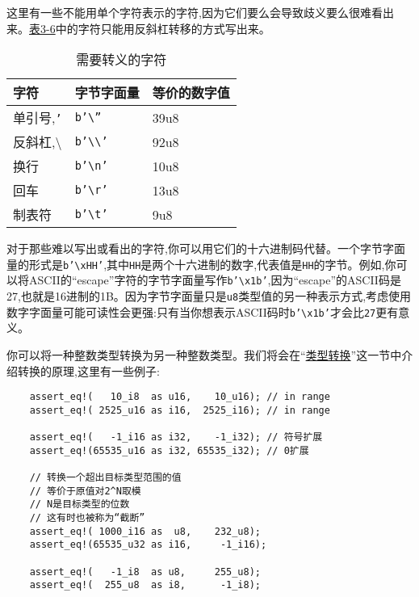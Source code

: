这里有一些不能用单个字符表示的字符,因为它们要么会导致歧义要么很难看出来。\hyperref[t3-6]{表3-6}中的字符只能用反斜杠转移的方式写出来。
\begin{table}[htbp]
    \centering
    \caption{需要转义的字符}
    \label{t3-6}
    \begin{tabular}{lll}
        \hline
        \textbf{字符}   &   \textbf{字节字面量} & \textbf{等价的数字值} \\
        \hline
        单引号,\texttt{'}   &   \texttt{b'\textbackslash''}      & 39u8 \\
        \rowcolor{tablecolor}
        反斜杠,\textbackslash &    \texttt{b'\textbackslash\textbackslash'} & 92u8 \\
        换行        &    \texttt{b'\textbackslash n'}    & 10u8 \\
        \rowcolor{tablecolor}
        回车        &   \texttt{b'\textbackslash r'}     & 13u8 \\
        制表符      &   \texttt{b'\textbackslash t'}     & 9u8 \\
    \end{tabular}
\end{table}

对于那些难以写出或看出的字符,你可以用它们的十六进制码代替。一个字节字面量的形式是\texttt{b'\textbackslash xHH'},其中\texttt{HH}是两个十六进制的数字,代表值是\texttt{HH}的字节。例如,你可以将ASCII的“escape”字符的字节字面量写作\texttt{b'\textbackslash x1b'},因为“escape”的ASCII码是27,也就是16进制的1B。因为字节字面量只是\texttt{u8}类型值的另一种表示方式,考虑使用数字字面量可能可读性会更强:只有当你想表示ASCII码时\texttt{b'\textbackslash x1b'}才会比\texttt{27}更有意义。

你可以将一种整数类型转换为另一种整数类型。我们将会在“\hyperref[cast]{类型转换}”这一节中介绍转换的原理,这里有一些例子:
\begin{verbatim}
    assert_eq!(   10_i8  as u16,    10_u16); // in range
    assert_eq!( 2525_u16 as i16,  2525_i16); // in range

    assert_eq!(   -1_i16 as i32,    -1_i32); // 符号扩展
    assert_eq!(65535_u16 as i32, 65535_i32); // 0扩展

    // 转换一个超出目标类型范围的值
    // 等价于原值对2^N取模
    // N是目标类型的位数
    // 这有时也被称为“截断”
    assert_eq!( 1000_i16 as  u8,    232_u8);
    assert_eq!(65535_u32 as i16,     -1_i16);

    assert_eq!(   -1_i8  as u8,     255_u8);
    assert_eq!(  255_u8  as i8,      -1_i8);
\end{verbatim}

